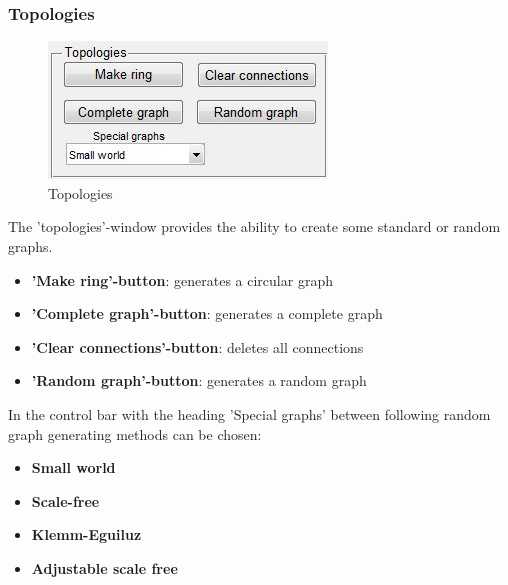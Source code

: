 \documentclass[12pt]{report}
\begin{document}
\subsubsection{Topologies}
\begin{figure}[h]
\centering
\includegraphics[scale=.8]{topo}
\caption{Topologies}
\label{FIG:abb34}
\end{figure}
The 'topologies'-window provides the ability to create some standard or random graphs.
\begin{itemize}
	\item \textbf{'Make ring'-button}: generates a circular graph
	\item \textbf{'Complete graph'-button}: generates a complete graph
	\item \textbf{'Clear connections'-button}: deletes all connections
	\item \textbf{'Random graph'-button}: generates a random graph
\end{itemize}
In the control bar with the heading 'Special graphs' between following random graph generating methods can be chosen:
\begin{itemize}
	\item \textbf{Small world}
	\item \textbf{Scale-free}
	\item \textbf{Klemm-Eguiluz}
	\item \textbf{Adjustable scale free}
\end{itemize}
\end{document}
